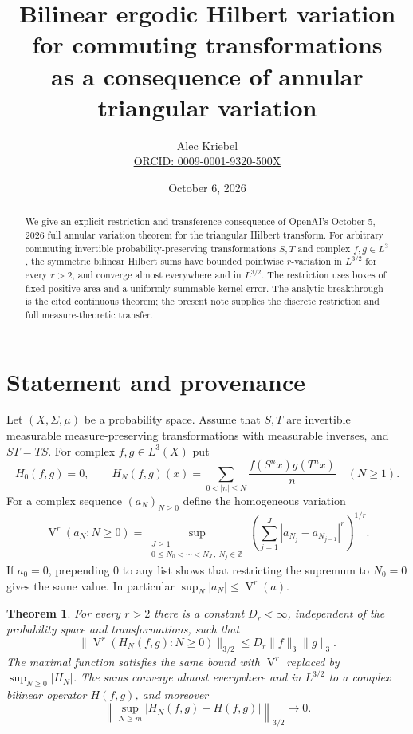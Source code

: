 \documentclass[11pt]{article}
\title{Bilinear ergodic Hilbert variation for commuting transformations\\as a consequence of annular triangular variation}
\author{Alec Kriebel\\\small\href{https://orcid.org/0009-0001-9320-500X}{ORCID: 0009-0001-9320-500X}}
\date{October 6, 2026}
\newtheorem{theorem}{Theorem}
\newcommand{\Z}{\mathbb Z}
\DeclareMathOperator{\Var}{V}
\begin{document}
\maketitle
\begin{abstract}
We give an explicit restriction and transference consequence of OpenAI's
October 5, 2026 full annular variation theorem for the triangular Hilbert
transform. For arbitrary commuting invertible probability-preserving
transformations $S,T$ and complex $f,g\in L^3$, the symmetric bilinear
Hilbert sums have bounded pointwise $r$-variation in $L^{3/2}$ for every
$r>2$, and converge almost everywhere and in $L^{3/2}$. The restriction
uses boxes of fixed positive area and a uniformly summable kernel error.
The analytic breakthrough is the cited continuous theorem; the present
note supplies the discrete restriction and full measure-theoretic transfer.
\end{abstract}

\section{Statement and provenance}
Let $(X,\Sigma,\mu)$ be a probability space. Assume that $S,T$ are
invertible measurable measure-preserving transformations with measurable
inverses, and $ST=TS$. For complex $f,g\in L^3(X)$ put
\[
 H_0(f,g)=0,\qquad
 H_N(f,g)(x)=\sum_{0<|n|\le N}\frac{f(S^n x)g(T^n x)}n\quad(N\ge1).
\]
For a complex sequence $(a_N)_{N\ge0}$ define the homogeneous variation
\begin{equation}\label{eq:variation}
 \Var^r(a_N:N\ge0)
 =\sup_{\substack{J\ge1\\0\le N_0<\cdots<N_J\,,\ N_j\in\Z}}
 \left(\sum_{j=1}^J|a_{N_j}-a_{N_{j-1}}|^r\right)^{1/r}.
\end{equation}
If $a_0=0$, prepending $0$ to any list shows that restricting the
supremum to $N_0=0$ gives the same value. In particular
$\sup_N|a_N|\le\Var^r(a)$.

\begin{theorem}\label{thm:ergodic}
For every $r>2$ there is a constant $D_r<\infty$, independent of the
probability space and transformations, such that
\begin{equation}\label{eq:ergodic-var}
 \|\Var^r(H_N(f,g):N\ge0)\|_{3/2}
 \le D_r\|f\|_3\|g\|_3.
\end{equation}
The maximal function satisfies the same bound with $\Var^r$ replaced
by $\sup_{N\ge0}|H_N|$. The sums converge almost everywhere and in
$L^{3/2}$ to a complex bilinear operator $H(f,g)$, and moreover
\begin{equation}\label{eq:tail}
 \left\|\sup_{N\ge m}|H_N(f,g)-H(f,g)|\right\|_{3/2}\longrightarrow0.
\end{equation}
\end{theorem}
\end{document}

